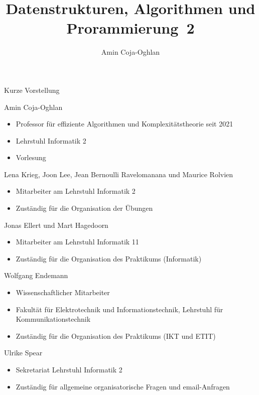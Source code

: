 \documentclass[aspectratio=1610, 11pt]{beamer}
\title{Datenstrukturen, Algorithmen und Prorammierung~2}
\author[A.~Coja-Oghlan]{Amin Coja-Oghlan}
\institute[DAP2]{Lehrstuhl Informatik 2\\Fakult\"at f\"ur Informatik}
\begin{document}
\maketitle

\begin{frame}{Kurze Vorstellung}
	\begin{overprint}
		\begin{exampleblock}{Amin Coja-Oghlan}
		\begin{itemize}
			\item Professor f\"ur effiziente Algorithmen und Komplexit\"atstheorie seit 2021
			\item Lehrstuhl Informatik 2
			\item Vorlesung
		\end{itemize}
	\end{exampleblock}
	\begin{exampleblock}{Lena Krieg, Joon Lee, Jean Bernoulli Ravelomanana und Maurice Rolvien}
		\begin{itemize}
			\item Mitarbeiter am Lehrstuhl Informatik 2
			\item Zust\"andig f\"ur die Organisation der \"Ubungen
		\end{itemize}
	\end{exampleblock}
	\begin{exampleblock}{Jonas Ellert und Mart Hagedoorn}
		\begin{itemize}
			\item Mitarbeiter am Lehrstuhl Informatik 11
			\item Zust\"andig f\"ur die Organisation des Praktikums (Informatik)
		\end{itemize}
	\end{exampleblock}
	\begin{exampleblock}{Wolfgang Endemann}
		\begin{itemize}
			\item Wissenschaftlicher Mitarbeiter
			\item Fakult\"at für Elektrotechnik und Informationstechnik, Lehrstuhl für Kommunikationstechnik
			\item Zust\"andig f\"ur die Organisation des Praktikums (IKT und ETIT)
		\end{itemize}
	\end{exampleblock}
	\begin{exampleblock}{Ulrike Spear}
		\begin{itemize}
			\item Sekretariat Lehrstuhl Informatik 2
			\item Zust\"andig f\"ur allgemeine organisatorische Fragen und email-Anfragen
		\end{itemize}
	\end{exampleblock}
	\end{overprint}
\end{frame}
\end{document}
